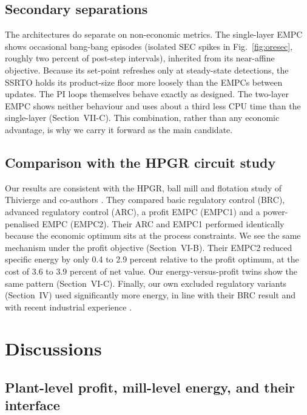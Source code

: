 \documentclass[conference]{IEEEtran}
\begin{document}
\subsection{Secondary separations}

The architectures do separate on non-economic metrics. The single-layer
EMPC shows occasional bang-bang episodes (isolated SEC spikes in
Fig.~\ref{fig:oresec}, roughly two percent of post-step intervals),
inherited from its near-affine objective. Because its set-point refreshes only
at steady-state detections, the SSRTO holds its product-size floor more
loosely than the EMPCs between updates. The PI loops themselves behave
exactly as designed. The two-layer EMPC shows neither behaviour and uses
about a third less CPU time than the single-layer (Section~VII-C). This
combination, rather than any economic advantage, is why we carry it
forward as the main candidate.

\subsection{Comparison with the HPGR circuit study}

Our results are consistent with the HPGR, ball mill and flotation study
of Thivierge and co-authors \cite{thivierge2023}. They compared basic
regulatory control (BRC), advanced regulatory control (ARC), a profit
EMPC (EMPC1) and a power-penalised EMPC (EMPC2). Their ARC and EMPC1
performed identically because the economic optimum sits at the process
constraints. We see the same mechanism under the profit objective
(Section~VI-B). Their EMPC2 reduced specific energy by only 0.4
to 2.9 percent relative to the profit optimum, at the cost of 3.6 to
3.9 percent of net value. Our energy-versus-profit twins show the same
pattern (Section~VI-C). Finally, our own excluded regulatory variants
(Section~IV) used significantly more energy, in line with their BRC
result and with recent industrial experience \cite{costa2025}.

\section{Discussions}

\subsection{Plant-level profit, mill-level energy, and their interface}
\end{document}
